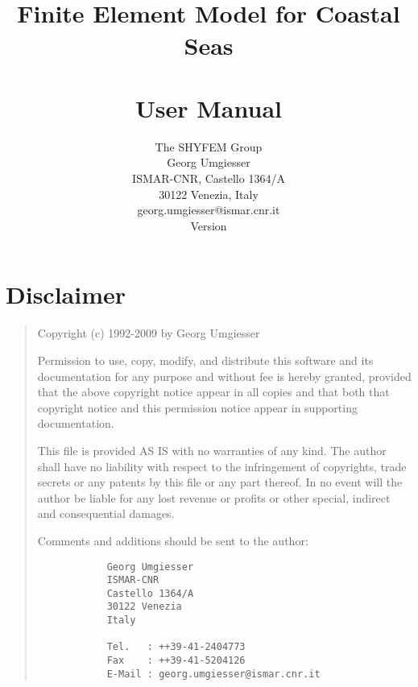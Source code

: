 \documentclass{report}
\title{%
	\shy{} 
	\\Finite Element Model for Coastal Seas
	\\~
	\\User Manual
	}
\author{%
	The SHYFEM Group \\
	Georg Umgiesser
	\\ISMAR-CNR, Castello 1364/A
	\\30122 Venezia, Italy
	\vspace{0.5cm}
	\\georg.umgiesser@ismar.cnr.it
	\vspace{1cm}
	\\Version \VERSION
	}
\begin{document}


\pagestyle{plain}

\maketitle

%

\thispagestyle{empty}

\newpage

\tableofcontents

\newpage





\chapter*{Disclaimer}


\begin{quotation}
  									 
   Copyright (c) 1992-2009 by Georg Umgiesser				 
  									 
   Permission to use, copy, modify, and distribute this software	 
   and its documentation for any purpose and without fee is hereby	 
   granted, provided that the above copyright notice appear in all	 
   copies and that both that copyright notice and this permission	 
   notice appear in supporting documentation.				 
  									 
   This file is provided AS IS with no warranties of any kind.		 
   The author shall have no liability with respect to the		 
   infringement of copyrights, trade secrets or any patents by		 
   this file or any part thereof.  In no event will the author		 
   be liable for any lost revenue or profits or other special,		 
   indirect and consequential damages.					 
  									 
   Comments and additions should be sent to the author:			 
  									 
	\begin{verbatim}
  			Georg Umgiesser					 
  			ISMAR-CNR					 
  			Castello 1364/A
  			30122 Venezia					 
  			Italy						 
  									 
  			Tel.   : ++39-41-2404773			 
  			Fax    : ++39-41-5204126			 
  			E-Mail : georg.umgiesser@ismar.cnr.it
	\end{verbatim}
\end{quotation}
\end{document}
